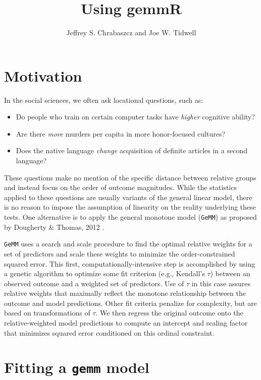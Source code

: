 \documentclass{article}\usepackage[]{graphicx}\usepackage[]{color}
\title{Using gemmR}
\author{Jeffrey S. Chrabaszcz and Joe W. Tidwell}
\begin{document}
\maketitle

\section*{Motivation}

In the social sciences, we often ask locational questions, such as:

\begin{itemize}
  \item Do people who train on certain computer tasks have \emph{higher} cognitive ability? \citep{tidwell2014counts}
  \item Are there \emph{more} murders per capita in more honor-focused cultures? \citep{dougherty2014deceptive}
  \item Does the native language \emph{change} acquisition of definite articles in a second language? \citep{chrabaszcz2014role}
\end{itemize}

These questions make no mention of the specific distance between relative groups and instead focus on the order of outcome magnitudes.
While the statistics applied to these questions are usually variants of the general linear model, there is no reason to impose the assumption of linearity on the reality underlying these tests.
One alternative is to apply the general monotone model (\texttt{GeMM}) as proposed by Dougherty \& Thomas, 2012 \citep{dougherty2012robust}.

\texttt{GeMM} uses a search and scale procedure to find the optimal relative weights for a set of predictors and scale these weights to minimize the order-constrained squared error.
This first, computationally-intensive step is accomplished by using a genetic algorithm to optimize some fit criterion (e.g., Kendall's $\tau$) between an observed outcome and a weighted set of predictors.
Use of $\tau$ in this case assures relative weights that maximally reflect the monotone relationship between the outcome and model predictions.
Other fit criteria penalize for complexity, but are based on transformations of $\tau$.
We then regress the original outcome onto the relative-weighted model predictions to compute an intercept and scaling factor that minimizes squared error conditioned on this ordinal constraint.

\section*{Fitting a \texttt{gemm} model}
\end{document}
